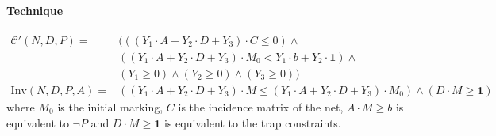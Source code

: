 \documentclass{article}
\begin{document}
\paragraph{Technique}
\begin{align*}
  \mathcal C'(N, D, P) =& ( ( ( Y_1 \cdot A + Y_2 \cdot D + Y_3) \cdot C \le 0) \land \\
& ((Y_1 \cdot A + Y_2 \cdot D + Y_3) \cdot M_0 < Y_1 \cdot b + Y_2 \cdot \mathbf{1}) \land \\
& (Y_1 \ge 0) \land (Y_2 \ge 0) \land (Y_3 \ge 0)) \\
  \text{Inv}(N, D, P, A) =& ( ( Y_1 \cdot A + Y_2 \cdot D + Y_3) \cdot M \le ( Y_1 \cdot A + Y_2 \cdot D + Y_3) \cdot M_0) \land ( D \cdot M \ge \mathbf{1} )
\end{align*}
where $M_0$ is the initial marking, $C$ is the incidence matrix of the net, $A\cdot M \ge b$ is equivalent to $\neg P$ and $D \cdot M \ge \mathbf{1}$ is equivalent to the trap constraints.
\end{document}
